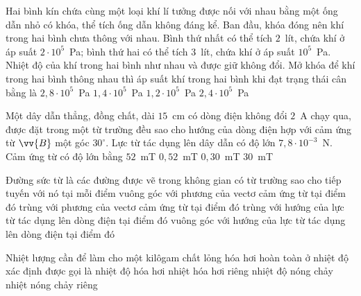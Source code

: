 	\begin{ex}%
		Hai bình kín chứa cùng một loại khí lí tưởng được nối với nhau bằng một ống dẫn nhỏ có khóa, thể tích ống dẫn không đáng kể. Ban đầu, khóa đóng nên khí trong hai bình chưa thông với nhau. Bình thứ nhất có thể tích $2$~lít, chứa khí ở áp suất $2\cdot 10^5$~Pa; bình thứ hai có thể tích $3$~lít, chứa khí ở áp suất $10^5$~Pa. Nhiệt độ của khí trong hai bình như nhau và được giữ không đổi. Mở khóa để khí trong hai bình thông nhau thì áp suất khí trong hai bình khi đạt trạng thái cân bằng là
		\choice
		{$2{,}8\cdot 10^5$~Pa}
		{\True $1{,}4\cdot 10^5$~Pa}
		{$1{,}2\cdot 10^5$~Pa}
		{$2{,}4\cdot 10^5$~Pa}
	\end{ex}

	\begin{ex}%
		Một dây dẫn thẳng, đồng chất, dài $15$~cm có dòng điện không đổi $2$~A chạy qua, được đặt trong một từ trường đều sao cho hướng của dòng điện hợp với cảm ứng từ $\vv{B}$ một góc $30^\circ$. Lực từ tác dụng lên dây dẫn có độ lớn $7{,}8\cdot 10^{-3}$~N. Cảm ứng từ có độ lớn bằng
		\choice
		{\True $52$~mT}
		{$0{,}52$~mT}
		{$0{,}30$~mT}
		{$30$~mT}
	\end{ex}

	\begin{ex}%
		Đường sức từ là các đường được vẽ trong không gian có từ trường sao cho tiếp tuyến với nó tại mỗi điểm
		\choice
		{vuông góc với phương của vectơ cảm ứng từ tại điểm đó}
		{\True trùng với phương của vectơ cảm ứng từ tại điểm đó}
		{trùng với hướng của lực từ tác dụng lên dòng điện tại điểm đó}
		{vuông góc với hướng của lực từ tác dụng lên dòng điện tại điểm đó}
	\end{ex}

	\begin{ex}%
		Nhiệt lượng cần để làm cho một kilôgam chất lỏng hóa hơi hoàn toàn ở nhiệt độ xác định được gọi là
		\choice
		{nhiệt độ hóa hơi}
		{\True nhiệt hóa hơi riêng}
		{nhiệt độ nóng chảy}
		{nhiệt nóng chảy riêng}
	\end{ex}

